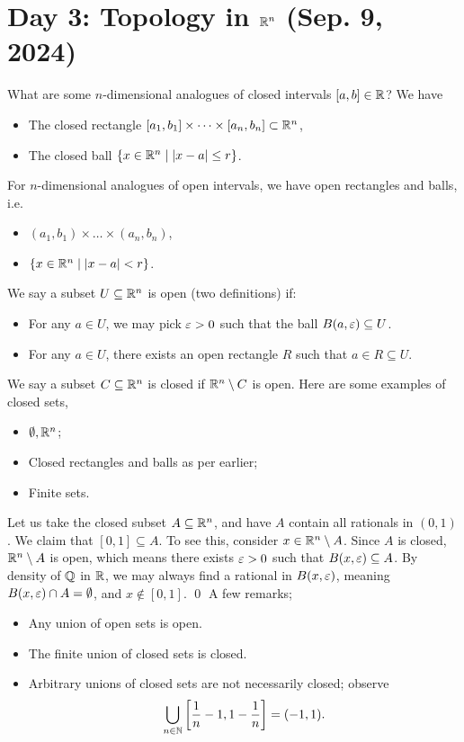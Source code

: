 \section{Day 3: Topology in \texorpdfstring{$\mathbb R^n$}{Rn} (Sep. 9, 2024)}
What are some $n$-dimensional analogues of closed intervals $[a, b] \in \mathbb R$? We have
\begin{itemize}
    \item The closed rectangle $[a_1, b_1] \times \dots \times [a_n, b_n] \subset \mathbb R^n$,
    \item The closed ball $\{x \in \mathbb R^n \mid \left\lvert x - a \right\rvert \leq r\}$.
\end{itemize}
For $n$-dimensional analogues of open intervals, we have open rectangles and balls, i.e.
\begin{itemize}
    \item $(a_1, b_1) \times \dots \times (a_n, b_n)$,
    \item $\{x \in \mathbb R^n \mid \left\lvert x - a \right\rvert < r\}$.
\end{itemize}
We say a subset $U \subseteq \mathbb R^n$ is open (two definitions) if:
\begin{itemize}
    \item For any $a \in U$, we may pick $\varepsilon > 0$ such that the ball $B(a, \varepsilon) \subseteq U$.
    \item For any $a \in U$, there exists an open rectangle $R$ such that $a \in R \subseteq U$.
\end{itemize}
We say a subset $C \subseteq \mathbb R^n$ is closed if $\mathbb R^n \setminus C$ is open. Here are some examples of closed sets,
\begin{itemize}
    \item $\emptyset, \mathbb R^n$;
    \item Closed rectangles and balls as per earlier;
    \item Finite sets.
\end{itemize}
Let us take the closed subset $A \subseteq \mathbb R^n$, and have $A$ contain all rationals in $(0, 1)$. We claim that $[0, 1] \subseteq A$. To see this, consider $x \in \mathbb R^n \setminus A$. Since $A$ is closed, $\mathbb R^n \setminus A$ is open, which means there exists $\varepsilon > 0$ such that $B(x, \varepsilon) \subseteq A$. By density of $\mathbb Q$ in $\mathbb R$, we may always find a rational in $B(x, \varepsilon)$, meaning $B(x, \varepsilon) \cap A = \emptyset$, and $x \not\in [0, 1]$. \qed
\medskip\newline
A few remarks;
\begin{itemize}
    \item Any union of open sets is open.
    \item The finite union of closed sets is closed.
    \item Arbitrary unions of closed sets are not necessarily closed; observe
    \[ \bigcup_{n \in \mathbb N} \left[\frac{1}{n}-1, 1-\frac{1}{n}\right] = (-1, 1). \]
\end{itemize}
